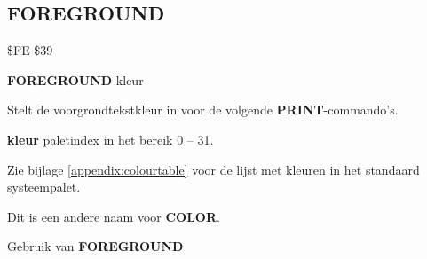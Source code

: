 
\newpage
\subsection{FOREGROUND}
\begin{description}[leftmargin=2cm,style=nextline]
\item [Token:]    \$FE \$39

\item [Formaat:]   {\bf FOREGROUND} kleur

\item [Gebruik:]    Stelt de voorgrondtekstkleur in voor de volgende {\bf PRINT}-commando's.

                  {\bf kleur} paletindex in het bereik 0 -- 31.

                  Zie bijlage \vref{appendix:colourtable} voor de lijst met kleuren in het standaard systeempalet.

\item [Opmerkingen:]  Dit is een andere naam voor {\bf COLOR}.

\item [Voorbeeld:]  Gebruik van {\bf FOREGROUND}


\end{description}


\newpage
